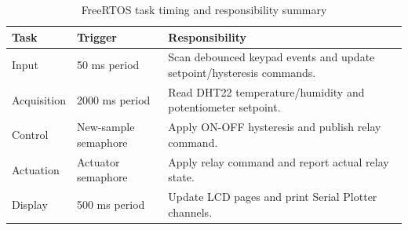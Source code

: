 \begin{table}[H]
\centering
\begin{tabular}{|p{3.2cm}|p{3.0cm}|p{7.0cm}|}
\hline
\textbf{Task} & \textbf{Trigger} & \textbf{Responsibility} \\
\hline
Input & 50 ms period & Scan debounced keypad events and update setpoint/hysteresis commands. \\
\hline
Acquisition & 2000 ms period & Read DHT22 temperature/humidity and potentiometer setpoint. \\
\hline
Control & New-sample semaphore & Apply ON-OFF hysteresis and publish relay command. \\
\hline
Actuation & Actuator semaphore & Apply relay command and report actual relay state. \\
\hline
Display & 500 ms period & Update LCD pages and print Serial Plotter channels. \\
\hline
\end{tabular}
\caption{FreeRTOS task timing and responsibility summary}
\label{tab:task_timing}
\end{table}
